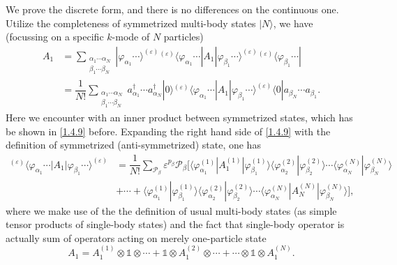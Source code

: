 \documentclass[b5paper,10pt,UTF8]{book}
\numberwithin{equation}{section}
\begin{document}
		\begin{Proof}
			We prove the discrete form, and there is no differences on the continuous one. Utilize the completeness of symmetrized multi-body states $|N\rangle$, we have (focussing on a specific $k$-mode of $N$ particles)
			\begin{align}
				A_1&=\sum_{\substack{\alpha_1\cdots\alpha_N\\\beta_1\cdots\beta_N}}|\varphi_{\alpha_1}\cdots\rangle^{(\varepsilon)}{}^{(\varepsilon)}\langle\varphi_{\alpha_1}\cdots|A_1|\varphi_{\beta_1}\cdots\rangle^{(\varepsilon)}{}^{(\varepsilon)}\langle\varphi_{\beta_1}\cdots|\label{1.5.3}\\
	 			&=\dfrac{1}{N!}\sum_{\substack{\alpha_1\cdots\alpha_N\\\beta_1\cdots\beta_N}}a_{\alpha_1}^\dagger\cdots a_{\alpha_N}^\dagger|0\rangle{}^{(\varepsilon)}\langle\varphi_{\alpha_1}\cdots|A_1|\varphi_{\beta_1}\cdots\rangle^{(\varepsilon)}\langle0|a_{\beta_N}\cdots a_{\beta_1}.\label{1.5.4}
			\end{align}
			Here we encounter with an inner product between symmetrized states, which has be shown in \eqref{1.4.9} before. Expanding the right hand side of \eqref{1.4.9} with the definition of symmetrized (anti-symmetrized) state, one has
			\begin{align}
				{}^{(\varepsilon)}\langle\varphi_{\alpha_1}\cdots|A_1|\varphi_{\beta_1}\cdots\rangle^{(\varepsilon)}&=\dfrac{1}{N!}\sum_{\mathcal{P}_\beta}\varepsilon^{p_\beta}\mathcal{P}_\beta\bigg[\langle\varphi_{\alpha_1}^{(1)}|A^{(1)}_1|\varphi_{\beta_1}^{(1)}\rangle\langle\varphi_{\alpha_2}^{(2)}|\varphi_{\beta_2}^{(2)}\rangle\cdots\langle\varphi_{\alpha_N}^{(N)}|\varphi_{\beta_N}^{(N)}\rangle\nonumber\\
				&+\cdots+\langle\varphi_{\alpha_1}^{(1)}|\varphi_{\beta_1}^{(1)}\rangle\langle\varphi_{\alpha_2}^{(2)}|\varphi_{\beta_2}^{(2)}\rangle\cdots\langle\varphi_{\alpha_N}^{(N)}|A^{(N)}_N|\varphi_{\beta_N}^{(N)}\rangle\bigg],\label{1.5.5}
			\end{align}
			where we make use of the the definition of usual multi-body states (as simple tensor products of single-body states) and the fact that single-body operator is actually sum of operators acting on merely one-particle state
			$$A_1=A_1^{(1)}\otimes\mathbb{1}\otimes\cdots+\mathbb{1}\otimes A_1^{(2)}\otimes\cdots+\cdots\otimes\mathbb{1}\otimes A_1^{(N)}.$$

\end{Proof}
\end{document}
